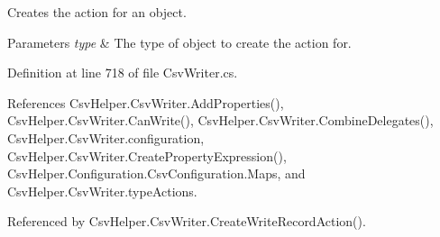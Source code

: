 Creates the action for an object. 


\begin{DoxyParams}{Parameters}
{\em type} & The type of object to create the action for.\\
\hline
\end{DoxyParams}


Definition at line 718 of file Csv\-Writer.\-cs.



References Csv\-Helper.\-Csv\-Writer.\-Add\-Properties(), Csv\-Helper.\-Csv\-Writer.\-Can\-Write(), Csv\-Helper.\-Csv\-Writer.\-Combine\-Delegates(), Csv\-Helper.\-Csv\-Writer.\-configuration, Csv\-Helper.\-Csv\-Writer.\-Create\-Property\-Expression(), Csv\-Helper.\-Configuration.\-Csv\-Configuration.\-Maps, and Csv\-Helper.\-Csv\-Writer.\-type\-Actions.



Referenced by Csv\-Helper.\-Csv\-Writer.\-Create\-Write\-Record\-Action().


